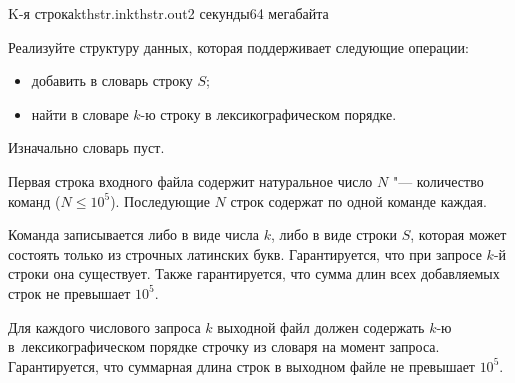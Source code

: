 \begin{problem}{K-я строка}{kthstr.in}{kthstr.out}{2 секунды}{64 мегабайта}

Реализуйте структуру данных, которая поддерживает следующие операции:

\begin{itemize}\compact
  \item добавить в словарь строку $S$;
  \item найти в словаре $k$-ю строку в лексикографическом порядке.
\end{itemize}

Изначально словарь пуст.

\InputFile

Первая строка входного файла содержит натуральное число $N$ "---
количество команд ($N \le 10^5$). Последующие $N$ строк содержат по
одной команде каждая.

Команда записывается либо в виде числа $k$, либо в виде строки $S$, которая
может состоять только из строчных латинских букв.
Гарантируется, что при запросе $k$-й строки она существует.
Также гарантируется, что сумма длин всех добавляемых строк не превышает $10^5$.

\OutputFile

Для каждого числового запроса $k$ выходной файл должен содержать $k$-ю 
в~лексикографическом порядке строчку из словаря на момент запроса.
Гарантируется, что суммарная длина строк в выходном файле не превышает $10^5$.

\Examples

\begin{example}
%
\end{example}

\end{problem}

